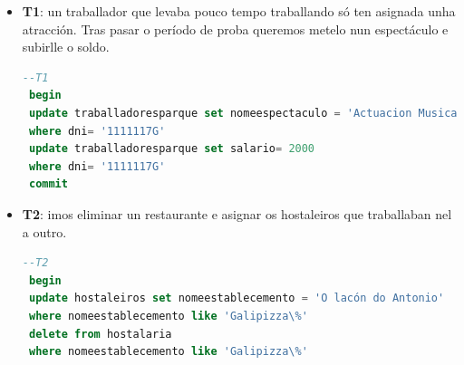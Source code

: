 \documentclass[12pt,a4paper]{book}
\theoremstyle{definition}
\theoremstyle{break}
\begin{document}
\begin{itemize}
	\item \textbf{T1}: un traballador que levaba pouco tempo traballando só ten asignada unha atracción. Tras pasar o período de proba queremos metelo nun espectáculo e subirlle o soldo.
	\begin{lstlisting}[language=sql,style=sql,tabsize=5, escapechar={|},
		keywordstyle=\color{blue}\ttfamily,
		stringstyle=\color{red}\ttfamily]
 --T1
 begin
 update traballadoresparque set nomeespectaculo = 'Actuacion Musical'
 where dni= '1111117G'
 update traballadoresparque set salario= 2000
 where dni= '1111117G'
 commit
	\end{lstlisting}
	\item \textbf{T2}: imos eliminar un restaurante e asignar os hostaleiros que traballaban nel a outro.
	\begin{lstlisting}[language=sql,style=sql,tabsize=5, escapechar={|},
		keywordstyle=\color{blue}\ttfamily,
		stringstyle=\color{red}\ttfamily]
 --T2
 begin
 update hostaleiros set nomeestablecemento = 'O lacón do Antonio'
 where nomeestablecemento like 'Galipizza\%'
 delete from hostalaria
 where nomeestablecemento like 'Galipizza\%'


\end{lstlisting}
\end{itemize}
\end{document}
